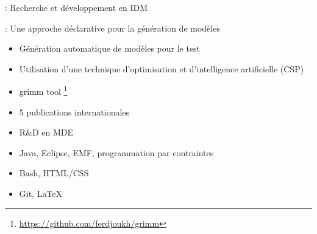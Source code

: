 
 : Recherche et développement en IDM

 : Une approche déclarative pour la génération de modèles 

\bigskip


\begin{itemize}
\item Génération automatique de modèles pour le test
\item Utilisation d'une technique d'optimisation et d'intelligence artificielle (CSP)
\end{itemize} 


\begin{itemize}
\item grimm tool \footnote{\url{https://github.com/ferdjoukh/grimm}}
\item 5 publications internationales
\end{itemize} 


\begin{itemize}
\item R\&D en MDE
\item Java, Eclipse, EMF, programmation par contraintes
\item Bash, HTML/CSS
\item Git, \LaTeX
\end{itemize} 